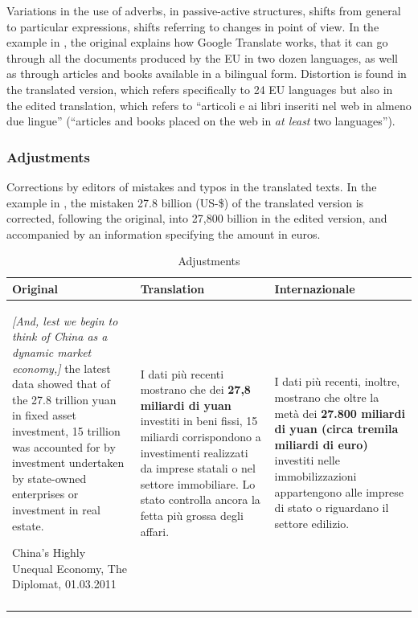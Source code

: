 \documentclass[output=paper]{LSP/langsci}
\begin{document}
Variations in the use of adverbs, in passive{}-active structures, shifts from general to particular expressions, shifts referring to changes in point of view. In the example in , the original explains how Google Translate works, that it can go through all the documents produced by the EU in two dozen languages, as well as through articles and books available in a bilingual form. Distortion is found in the translated version, which refers specifically to 24 EU languages but also in the edited translation, which refers to ``articoli e ai libri inseriti nel web in almeno due lingue'' (``articles and books placed on the web in \textit{at least} two languages'').

\subsubsection{Adjustments}

Corrections by editors of mistakes and typos in the translated texts. In the example in , the mistaken 27.8 billion (US-\$) of the translated version is corrected, following the original, into 27,800 billion in the edited version, and accompanied by an information specifying the amount in euros.

%
\begin{table}
 \tiny
 \caption{Adjustments}
 \label{troqe-marchan:tab:8}
\begin{tabularx}{\textwidth}{XXX}
\lsptoprule
  Original &  Translation &  Internazionale \\
 \midrule
\textit{[And, lest we begin to think of China as a dynamic market economy,]} the latest data showed that of the 27.8 trillion yuan in fixed asset investment, 15 trillion was accounted for by investment undertaken by state-owned enterprises or investment in real estate.

 China's Highly Unequal Economy, The Diplomat, 01.03.2011 & I dati più recenti mostrano che dei \textbf{27,8 miliardi di yuan} investiti in beni fissi, 15 miliardi corrispondono a investimenti realizzati da imprese statali o nel settore immobiliare. Lo stato controlla ancora la fetta più grossa degli affari. & I dati più recenti, inoltre, mostrano che oltre la metà dei \textbf{27.800 miliardi di yuan (circa tremila miliardi di euro)} investiti nelle immobilizzazioni appartengono alle imprese di stato o riguardano il settore edilizio.\\
\lspbottomrule
\end{tabularx}
\end{table}
\end{document}
